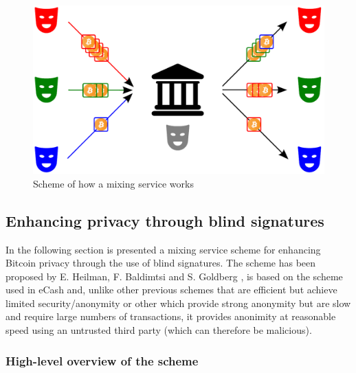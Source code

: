 \begin{figure}[!htb]
	\centering
	\includegraphics[width=1\linewidth]{img/mixing-service-scheme.png}
	\caption{Scheme of how a mixing service works}
	\label{fig:mixing-service-scheme}
\end{figure}






\subsection{Enhancing privacy through blind signatures}\label{sec:enh-sign} In
the following section is presented a mixing service scheme for enhancing Bitcoin
privacy through the use of blind signatures. The scheme has been proposed  by E.
Heilman, F. Baldimtsi and S. Goldberg \cite{heilman-blindly-signed-contracts},
is based on the scheme used in eCash \cite{Chaum1984} and, unlike other previous
schemes that are efficient but achieve limited security/anonymity or other which
provide strong anonymity but are slow and require large numbers of transactions,
it provides anonimity at reasonable speed using an untrusted third party (which
can therefore be malicious).

\subsubsection{High-level overview of the scheme}
